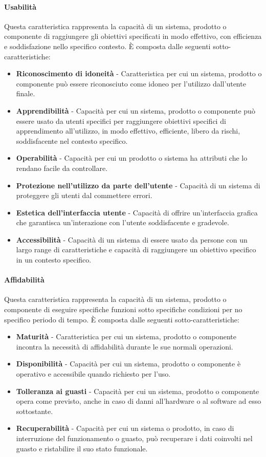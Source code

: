 \documentclass[../main.tex]{subfiles}
\begin{document}
\paragraph{Usabilità}
Questa caratteristica rappresenta la capacità di un sistema, prodotto o componente di raggiungere gli obiettivi specificati in modo effettivo, con efficienza e soddisfazione nello specifico contesto. È composta dalle seguenti sotto-caratteristiche:
\begin{itemize}
\item \textbf{Riconoscimento di idoneità} - Caratteristica per cui un sistema, prodotto o componente può essere riconosciuto come idoneo per l'utilizzo dall'utente finale.
\item \textbf{Apprendibilità} - Capacità per cui un sistema, prodotto o componente può essere usato da utenti specifici per raggiungere obiettivi specifici di apprendimento all'utilizzo, in modo effettivo, efficiente, libero da rischi, soddisfacente nel contesto specifico.
\item \textbf{Operabilità} - Capacità per cui un prodotto o sistema ha attributi che lo rendano facile da controllare. 
\item \textbf{Protezione nell'utilizzo da parte dell'utente} -  Capacità di un sistema di proteggere gli utenti dal commettere errori.
\item \textbf{Estetica dell'interfaccia utente} -  Capacità di offrire un'interfaccia grafica che garantisca un'interazione con l'utente soddisfacente e gradevole.
\item \textbf{Accessibilità} -  Capacità di un sistema di essere usato da persone con un largo range di caratteristiche e capacità di raggiungere un obiettivo specifico in un contesto specifico.
\end{itemize}

\paragraph{Affidabilità}
Questa caratteristica rappresenta la capacità di un sistema, prodotto o componente di eseguire specifiche funzioni sotto specifiche condizioni per no specifico periodo di tempo. È composta dalle seguenti sotto-caratteristiche:
\begin{itemize}
\item \textbf{Maturità} - Caratteristica per cui un sistema, prodotto o componente incontra la necessità di affidabilità durante le sue normali operazioni.
\item \textbf{Disponibilità} - Capacità per cui un sistema, prodotto o componente è operativo e accessibile quando richiesto per l'uso.
\item \textbf{Tolleranza ai guasti} - Capacità per cui un sistema, prodotto o componente opera come previsto, anche in caso di danni all'hardware o al software ad esso sottostante.
\item \textbf{Recuperabilità} - Capacità per cui un sistema o prodotto, in caso di interruzione del funzionamento o guasto, può recuperare i dati coinvolti nel guasto e ristabilire il suo stato funzionale.
\end{itemize}
\end{document}
